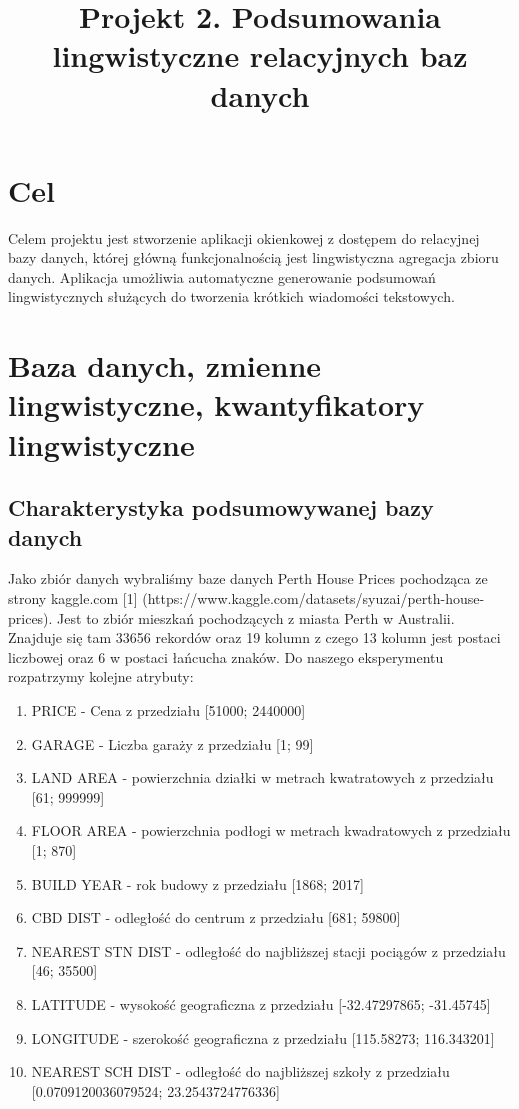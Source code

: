 \documentclass{classrep}
\author{
  \studentinfo{Przemysław Lis}{229940} \and
  \studentinfo{Michał Olczak}{229972} }
\title{Projekt 2.  Podsumowania lingwistyczne relacyjnych baz danych}
\begin{document}
\maketitle


\section{Cel}
Celem projektu jest stworzenie aplikacji okienkowej z dostępem do relacyjnej bazy danych, której główną funkcjonalnością jest lingwistyczna agregacja zbioru danych. Aplikacja umożliwia automatyczne generowanie podsumowań lingwistycznych służących do tworzenia krótkich wiadomości tekstowych.


\section{Baza danych, zmienne lingwistyczne, kwantyfikatory lingwistyczne}

\subsection{Charakterystyka podsumowywanej bazy danych}
Jako zbiór danych wybraliśmy baze danych Perth House Prices pochodząca ze strony kaggle.com [1] (https://www.kaggle.com/datasets/syuzai/perth-house-prices). Jest to zbiór mieszkań pochodzących z miasta Perth w Australii. Znajduje się tam 33656 rekordów oraz 19 kolumn z czego 13 kolumn jest postaci liczbowej oraz 6 w postaci łańcucha znaków. Do naszego eksperymentu rozpatrzymy kolejne atrybuty:
\begin{enumerate}
\item PRICE - Cena z przedziału [51000; 2440000]
\item GARAGE - Liczba garaży z przedziału [1; 99]
\item LAND AREA - powierzchnia działki w metrach kwatratowych z przedziału [61; 999999]
\item FLOOR AREA - powierzchnia podłogi w metrach kwadratowych z przedziału [1; 870]
\item BUILD YEAR - rok budowy z przedziału [1868; 2017]
\item CBD DIST - odległość do centrum z przedziału [681; 59800]
\item NEAREST STN DIST - odległość do najbliższej stacji pociągów z przedziału [46; 35500]
\item LATITUDE - wysokość geograficzna z przedziału [-32.47297865; -31.45745]
\item LONGITUDE - szerokość geograficzna z przedziału [115.58273; 116.343201]
\item NEAREST SCH DIST - odległość do najbliższej szkoły z przedziału [0.0709120036079524; 23.2543724776336]
\end{enumerate}
\end{document}
